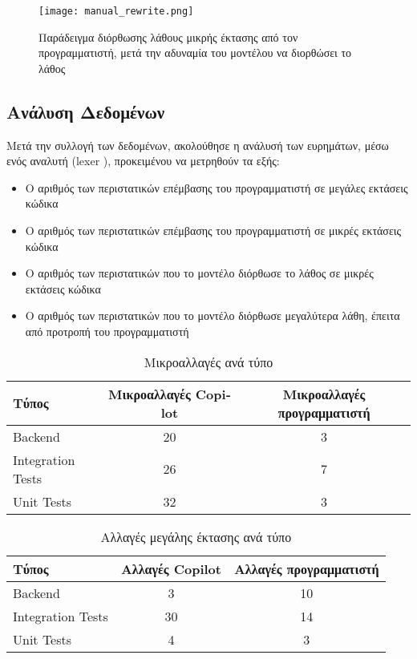   \begin{figure}[H]
    \begin{center}
      \texttt{[image: manual\_rewrite.png]}
      \caption{Παράδειγμα διόρθωσης λάθους μικρής έκτασης από τον
        προγραμματιστή, μετά την αδυναμία του μοντέλου να διορθώσει το
      λάθος}
    \end{center}
    \label{fig:manualRewrite}
  \end{figure}

  \subsection{Ανάλυση Δεδομένων}

  Μετά την συλλογή των δεδομένων, ακολούθησε η ανάλυσή των ευρημάτων, μέσω
  ενός αναλυτή (\textlatin{lexer} \cite{ball2018}), προκειμένου να
  μετρηθούν τα εξής:

  \begin{itemize}
    \item
      O αριθμός των περιστατικών επέμβασης του προγραμματιστή σε μεγάλες
      εκτάσεις κώδικα
    \item
      Ο αριθμός των περιστατικών επέμβασης του προγραμματιστή σε μικρές
      εκτάσεις κώδικα
    \item
      Ο αριθμός των περιστατικών που το μοντέλο διόρθωσε το λάθος σε μικρές
      εκτάσεις κώδικα
    \item
      Ο αριθμός των περιστατικών που το μοντέλο διόρθωσε μεγαλύτερα λάθη,
      έπειτα από προτροπή του προγραμματιστή
  \end{itemize}

  \begin{table}[h]
    \centering
    \begin{tabular}{lcc}
      \hline
      \textbf{Τύπος} & \textbf{Μικροαλλαγές \textlatin{Copilot}} &
      \textbf{Μικροαλλαγές προγραμματιστή} \\ \hline
      \textlatin{Backend} & 20 & 3 \\
      \textlatin{Integration Tests} & 26 & 7 \\
      \textlatin{Unit Tests} & 32 & 3 \\ \hline
    \end{tabular}
    \caption{Μικροαλλαγές ανά τύπο}
    \label{table:microchanges_by_subject}
  \end{table}

  \begin{table}[h]
    \centering
    \begin{tabular}{lcc}
      \hline
      \textbf{Τύπος} & \textbf{Αλλαγές \textlatin{Copilot}} &
      \textbf{Αλλαγές προγραμματιστή} \\ \hline
      \textlatin{Backend} & 3 & 10 \\
      \textlatin{Integration Tests} & 30 & 14 \\
      \textlatin{Unit Tests} & 4 & 3 \\ \hline
    \end{tabular}
    \caption{Αλλαγές μεγάλης έκτασης ανά τύπο}
    \label{table:major_changes_by_subject}
  \end{table}

